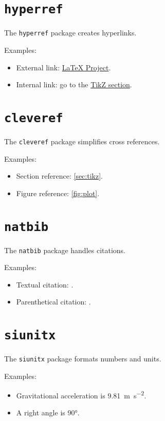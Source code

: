 \documentclass[12pt]{article}
\begin{document}
\section{\texttt{hyperref}}\label{sec:hyperref}
The \texttt{hyperref} package creates hyperlinks.

Examples:
\begin{itemize}
  \item External link: \href{https://www.latex-project.org}{LaTeX Project}.
  \item Internal link: go to the \hyperref[sec:tikz]{TikZ section}.
\end{itemize}

\section{\texttt{cleveref}}\label{sec:cleveref}
The \texttt{cleveref} package simplifies cross references.

Examples:
\begin{itemize}
  \item Section reference: \cref{sec:tikz}.
  \item Figure reference: \cref{fig:plot}.
\end{itemize}

\section{\texttt{natbib}}\label{sec:natbib}
The \texttt{natbib} package handles citations.

Examples:
\begin{itemize}
  \item Textual citation: \citet{knuth1990}.
  \item Parenthetical citation: \citep{lamport1994}.
\end{itemize}

\section{\texttt{siunitx}}\label{sec:siunitx}
The \texttt{siunitx} package formats numbers and units.

Examples:
\begin{itemize}
  \item Gravitational acceleration is \SI{9.81}{\metre\per\second\squared}.
  \item A right angle is \ang{90}.
\end{itemize}
\end{document}

